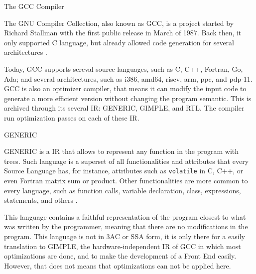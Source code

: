 \begin{section}{The GCC Compiler}

The GNU Compiler Collection, also known as GCC, is a project started by
Richard Stallman with the first public release in March of 1987. Back then,
it only supported C language, but already allowed code generation for
several architectures \citep{gcc_first_ver}.

Today, GCC supports sereval source languages, such as C, C++, Fortran, Go, Ada;
and several architectures, such as i386, amd64, riscv, arm, ppc, and pdp-11. GCC
is also an optimizer compiler, that means it can modify the input code to generate
a more efficient version without changing the program semantic. This is archived
through its several IR: GENERIC, GIMPLE,
and RTL. The compiler run optimization passes on each of these IR.


\begin{subsection}{GENERIC}

	GENERIC is a IR that allows to represent any function in the program with trees.
Such language is a superset of all functionalities and attributes that every Source
Language has, for instance, attributes such as \texttt{volatile} in C, C++, or even
Fortran matrix sum or product. Other functionalities are more common to every language,
such as function calls, variable declaration, class, expressions, statements, and
others \citep{generic}.


	This language contains a faithful representation of the program closest to
	what was written by the programmer, meaning that there are no modifications
	in the program. This language is not in 3AC or SSA form, it is only there
	for a easily translation to GIMPLE, the hardware-independent IR of GCC
	in which most optimizations are done, and to make the development of a
	Front End easily. However, that does not means that optimizations can not
	be applied here.


\end{subsection}
\end{section}
